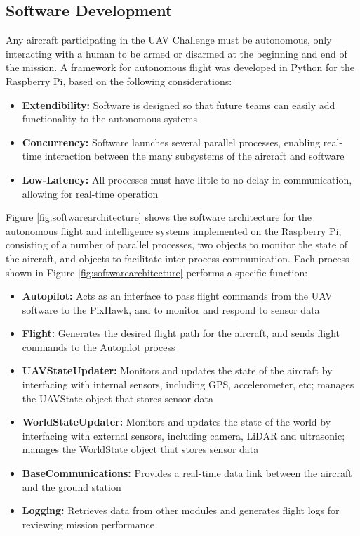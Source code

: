 \subsection{Software Development}
Any aircraft participating in the UAV Challenge must be autonomous, only interacting with a human to be armed or disarmed at the beginning and end of the mission. A framework for autonomous flight was developed in Python for the Raspberry Pi, based on the following considerations:
\begin{itemize}
	\item \textbf{Extendibility:} Software is designed so that future teams can easily add functionality to the autonomous systems
	\item \textbf{Concurrency:} Software launches several parallel processes, enabling real-time interaction between the many subsystems of the aircraft and software
	\item \textbf{Low-Latency:} All processes must have little to no delay in communication, allowing for real-time operation 
\end{itemize}

Figure \ref{fig:softwarearchitecture} shows the software architecture for the autonomous flight and intelligence systems implemented on the Raspberry Pi, consisting of a number of parallel processes, two objects to monitor the state of the aircraft, and objects to facilitate inter-process communication. Each process shown in Figure \ref{fig:softwarearchitecture} performs a specific function:
\begin{itemize}
	\item \textbf{Autopilot:} Acts as an interface to pass flight commands from the UAV software to the PixHawk, and to monitor and respond to sensor data
	\item \textbf{Flight:} Generates the desired flight path for the aircraft, and sends flight commands to the Autopilot process
	\item \textbf{UAVStateUpdater:} Monitors and updates the state of the aircraft by interfacing with internal sensors, including GPS, accelerometer, etc; manages the UAVState object that stores sensor data
	\item \textbf{WorldStateUpdater:} Monitors and updates the state of the world by interfacing with external sensors, including camera, LiDAR and ultrasonic; manages the WorldState object that stores sensor data
	\item \textbf{BaseCommunications:} Provides a real-time data link between the aircraft and the ground station
	\item \textbf{Logging:} Retrieves data from other modules and generates flight logs for reviewing mission performance
\end{itemize}

